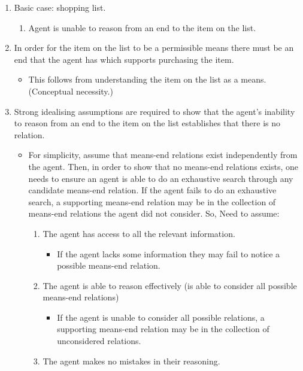 \documentclass[10pt]{article}
\begin{document}
\begin{enumerate}
\item Basic case: shopping list.
  \begin{enumerate}
  \item Agent is unable to reason from an end to the item on the list.
  \end{enumerate}
\item In order for the item on the list to be a permissible means there must be an end that the agent has which supports purchasing the item.
  \begin{itemize}
  \item This follows from understanding the item on the list as a means.
    (Conceptual necessity.)
  \end{itemize}
\item Strong idealising assumptions are required to show that the agent's inability to reason from an end to the item on the list establishes that there is no relation.
  \begin{itemize}
  \item For simplicity, assume that means-end relations exist independently from the agent.
    Then, in order to show that no means-end relations exists, one needs to ensure an agent is able to do an exhaustive search through any candidate means-end relation.
    If the agent fails to do an exhaustive search, a supporting means-end relation may be in the collection of means-end relations the agent did not consider.
    So, Need to assume:
    \begin{enumerate}
    \item The agent has access to all the relevant information.
      \begin{itemize}
      \item If the agent lacks some information they may fail to notice a possible means-end relation.
      \end{itemize}
    \item The agent is able to reason effectively (is able to consider all possible means-end relations)
      \begin{itemize}
      \item If the agent is unable to consider all possible relations, a supporting means-end relation may be in the collection of unconsidered relations.
      \end{itemize}
    \item The agent makes no mistakes in their reasoning.
      \begin{itemize}

\end{itemize}
\end{enumerate}
\end{itemize}
\end{enumerate}
\end{document}
